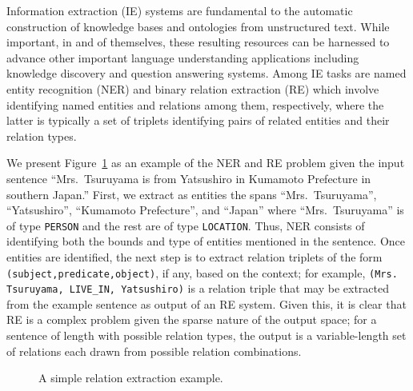 \documentclass{clv3}
\newcommand{\ere}{RE}
\begin{document}
Information extraction (IE) systems are fundamental to the automatic construction of knowledge bases and ontologies from unstructured text. While important, in and of themselves, these resulting resources can be harnessed to advance other important language understanding applications including knowledge discovery and question answering systems. Among IE tasks are named entity recognition (NER) and binary relation extraction (RE) which involve identifying named entities and relations among them, respectively, where the latter is typically a set of triplets identifying pairs of related entities and their relation types. 

We present Figure~\ref{fig_example} as an example of the NER and RE problem given the input sentence 
``Mrs.~Tsuruyama is from Yatsushiro in Kumamoto Prefecture in southern Japan.'' First, we extract as entities the spans ``Mrs.~Tsuruyama'', ``Yatsushiro'', ``Kumamoto Prefecture'', and ``Japan'' where ``Mrs.~Tsuruyama'' is of type \texttt{PERSON} and the rest are of type \texttt{LOCATION}. Thus, NER consists of identifying both the bounds and type of entities mentioned in the sentence. Once entities are identified, the next step is to extract relation triplets of the form \texttt{(subject,predicate,object)}, if any, based on the context; for example, \texttt{(Mrs. Tsuruyama, LIVE\_IN, Yatsushiro)} is a relation triple that may be extracted from the example sentence as output of an RE system. Given this, it is clear that \ere{} is a complex problem given the sparse nature of the output space; for a sentence of  length with  possible relation types, the output is a variable-length set of relations each drawn from  possible relation combinations.

\begin{figure}[t]
  \caption{A simple relation extraction example.}
  \label{fig_example}
\end{figure}
\end{document}
